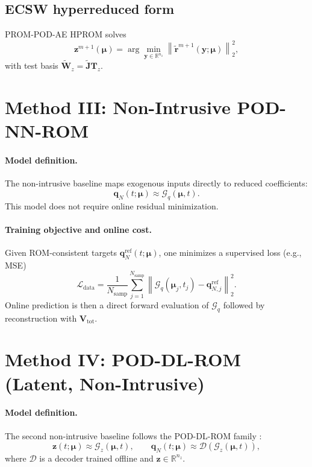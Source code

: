 \documentclass[11pt]{article}
\begin{document}
\subsection{ECSW hyperreduced form}
PROM-POD-AE HPROM solves
\begin{equation}
\mathbf z^{m+1}(\bm\mu)
=
\arg\min_{\mathbf y\in\mathbb R^{n_z}}
\left\|\widetilde{\mathbf r}^{m+1}(\mathbf y;\bm\mu)\right\|_2^2,
\end{equation}
with test basis $\widetilde{\mathbf W}_z=\widetilde{\mathbf J}\mathbf T_z$.

\section{Method III: Non-Intrusive POD-NN-ROM}
\label{sec:method-datadriven}

\paragraph{Model definition.}
The non-intrusive baseline maps exogenous inputs directly to reduced coefficients:
\begin{equation}
\mathbf q_N(t;\bm\mu)\approx\mathcal G_q(\bm\mu,t).
\label{eq:data-driven-map-q}
\end{equation}
This model does not require online residual minimization.

\paragraph{Training objective and online cost.}
Given ROM-consistent targets $\mathbf q_N^{\mathrm{ref}}(t;\bm\mu)$, one minimizes a supervised loss (e.g., MSE)
\begin{equation}
\mathcal L_{\mathrm{data}}
=\frac{1}{N_{\mathrm{samp}}}\sum_{j=1}^{N_{\mathrm{samp}}}
\left\|\mathcal G_q(\bm\mu_j,t_j)-\mathbf q_{N,j}^{\mathrm{ref}}\right\|_2^2.
\end{equation}
Online prediction is then a direct forward evaluation of $\mathcal G_q$ followed by reconstruction with $\mathbf V_{\mathrm{tot}}$.

\section{Method IV: POD-DL-ROM (Latent, Non-Intrusive)}
\label{sec:method-datadriven-latent}

\paragraph{Model definition.}
The second non-intrusive baseline follows the POD-DL-ROM family \cite{fresca2022pod}:
\begin{equation}
\mathbf z(t;\bm\mu)\approx\mathcal G_z(\bm\mu,t),\qquad
\mathbf q_N(t;\bm\mu)\approx\mathcal D\!\left(\mathcal G_z(\bm\mu,t)\right),
\label{eq:data-driven-map-z}
\end{equation}
where $\mathcal D$ is a decoder trained offline and $\mathbf z\in\mathbb R^{n_z}$.
\end{document}
